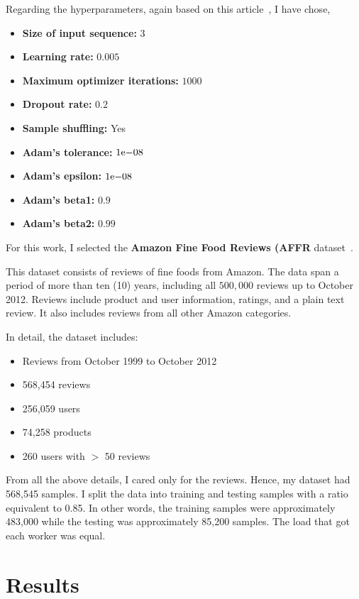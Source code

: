 Regarding the hyperparameters, again based on this article~\cite{rushabhwadkar_2019}, I have chose,
\begin{itemize}
    \item \textbf{Size of input sequence:} $3$
    \item \textbf{Learning rate:} $0.005$
    \item \textbf{Maximum optimizer iterations:} $1000$
    \item \textbf{Dropout rate:} $0.2$
    \item \textbf{Sample shuffling:} Yes
    \item \textbf{Adam's tolerance:} ${1}\mathrm{e}{-08}$
    \item \textbf{Adam's epsilon:} ${1}\mathrm{e}{-08}$
    \item \textbf{Adam's beta1:} $0.9$
    \item \textbf{Adam's beta2:} $0.99$
\end{itemize}

For this work, I selected the \textbf{Amazon Fine Food Reviews (AFFR} dataset~\cite{amazon_dataset}.

This dataset consists of reviews of fine foods from Amazon.
The data span a period of more than ten (10) years, including all $500,000$ reviews up to October 2012.
Reviews include product and user information, ratings, and a plain text review.
It also includes reviews from all other Amazon categories.

In detail, the dataset includes:

\begin{itemize}
    \item Reviews from October 1999 to October 2012
    \item 568,454 reviews
    \item 256,059 users
    \item 74,258 products
    \item 260 users with $>$ 50 reviews

\end{itemize}

From all the above details, I cared only for the reviews.
Hence, my dataset had 568,545 samples.
I split the data into training and testing samples with a ratio equivalent to 0.85.
In other words, the training samples were approximately 483,000 while the testing was approximately 85,200 samples.
The load that got each worker was equal.

\newpage

\section{Results}\label{sec:results}

